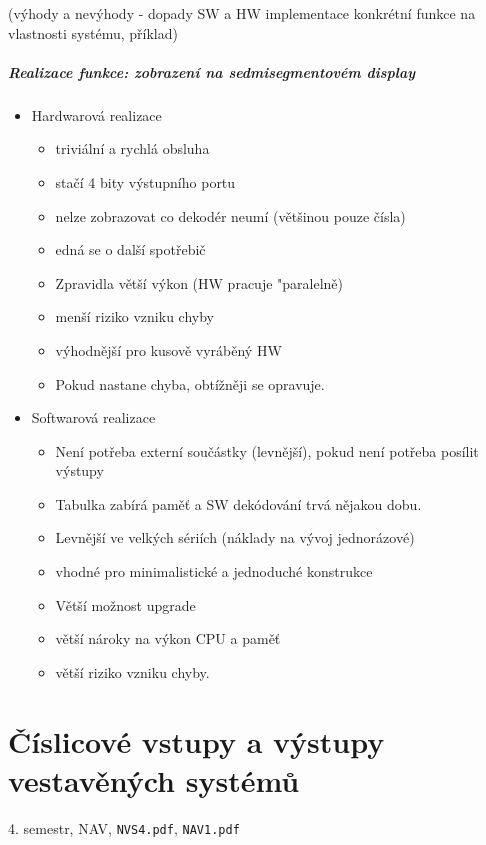 \documentclass[a4paper, 11pt]{report}
\begin{document}
(výhody a nevýhody - dopady SW a HW implementace konkrétní funkce na vlastnosti systému, příklad)

\paragraph{Realizace funkce: zobrazení na sedmisegmentovém display}
\begin{itemize}
	\item Hardwarová realizace
	\begin{itemize}
		\item triviální a rychlá obsluha
		\item stačí 4 bity výstupního portu
		\item nelze zobrazovat co dekodér neumí (většinou pouze čísla)
		\item edná se o další spotřebič
		\item Zpravidla větší výkon (HW pracuje "paralelně)
		\item menší riziko vzniku chyby
		\item výhodnější pro kusově vyráběný HW
		\item Pokud nastane chyba, obtížněji se opravuje.
	\end{itemize}
	\item Softwarová realizace
	\begin{itemize}
		\item Není potřeba externí součástky (levnější), pokud není potřeba posílit výstupy
		\item Tabulka zabírá paměť a SW dekódování trvá nějakou dobu.
		\item Levnější ve velkých sériích (náklady na vývoj jednorázové)
		\item vhodné pro minimalistické a jednoduché konstrukce
		\item Větší možnost upgrade
		\item větší nároky na výkon CPU a paměť
		\item větší riziko vzniku chyby.
	\end{itemize}
\end{itemize}

\chapter{Číslicové vstupy a výstupy vestavěných systémů} \label{cha:60}
4. semestr, NAV, \texttt{NVS4.pdf}, \texttt{NAV1.pdf}
\end{document}
